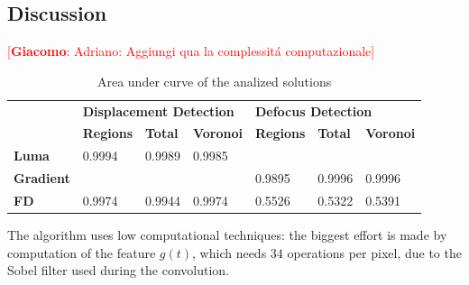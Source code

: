 \documentclass{llncs}
\newcommand{\gi}[1]{{\textcolor{red}{[\small \textbf{Giacomo}: #1]}}}
\begin{document}
\subsection{Discussion}
\gi{Adriano: Aggiungi qua la complessit\'a computazionale}
\begin{table}[tbh]
\centering
\begin{tabular}{l|l|l|l|l|l|l|}
\cline{2-7}
& \multicolumn{3}{l|}{\cellcolor[HTML]{C0C0C0}\textbf{Displacement Detection}}  & \multicolumn{3}{l|}{\cellcolor[HTML]{C0C0C0}\textbf{Defocus Detection}} \\ \cline{2-7} 
& \cellcolor[HTML]{EFEFEF}\textbf{Regions} & \cellcolor[HTML]{EFEFEF}\textbf{Total} & \cellcolor[HTML]{EFEFEF}\textbf{Voronoi} & \cellcolor[HTML]{EFEFEF}\textbf{Regions} & \cellcolor[HTML]{EFEFEF}\textbf{Total} & \cellcolor[HTML]{EFEFEF}\textbf{Voronoi} \\ \hline
\multicolumn{1}{|l|}{\cellcolor[HTML]{EFEFEF}\textbf{Luma}}     & 0.9994 & 0.9989 & 0.9985  &            &            &             \\ \hline
\multicolumn{1}{|l|}{\cellcolor[HTML]{EFEFEF}\textbf{Gradient}} &  		 &  		  &             & 0.9895 & 0.9996 & 0.9996  \\ \hline
\multicolumn{1}{|l|}{\cellcolor[HTML]{EFEFEF}\textbf{FD}}         & 0.9974 & 0.9944 & 0.9974  & 0.5526 & 0.5322 & 0.5391  \\ \hline
\end{tabular}
\caption{Area under curve of the analized solutions}
\label{tab:AUC}
\end{table}

The algorithm uses low computational techniques: the biggest effort is made by computation of the feature $g(t)$, which needs $34$ operations per pixel, due to the Sobel filter used during the convolution.

\end{document}
